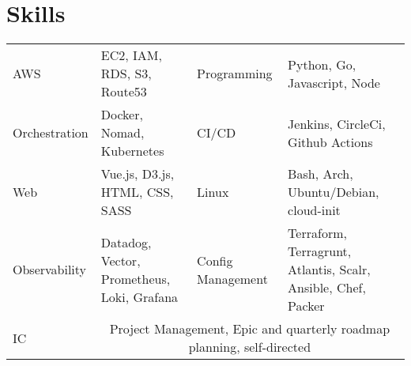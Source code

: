 \section{Skills}
\begin{tabularx}{\linewidth}{ l X | l X }
  AWS & \normalsize{EC2, IAM, RDS, S3, Route53} &
  Programming & \normalsize{Python, Go, Javascript, Node} \\
  Orchestration & \normalsize{Docker, Nomad, Kubernetes} &
  CI/CD & \normalsize{Jenkins, CircleCi, Github Actions} \\
  Web & \normalsize{Vue.js, D3.js, HTML, CSS, SASS} &
  Linux & \normalsize{Bash, Arch, Ubuntu/Debian, cloud-init} \\
  Observability & \normalsize{Datadog, Vector, Prometheus, Loki, Grafana} &
  Config Management & \normalsize{Terraform, Terragrunt, Atlantis, Scalr, Ansible, Chef, Packer} \\
  IC & \multicolumn{3}{c}{\normalsize{Project Management, Epic and quarterly roadmap planning, self-directed}} \\
\end{tabularx}
